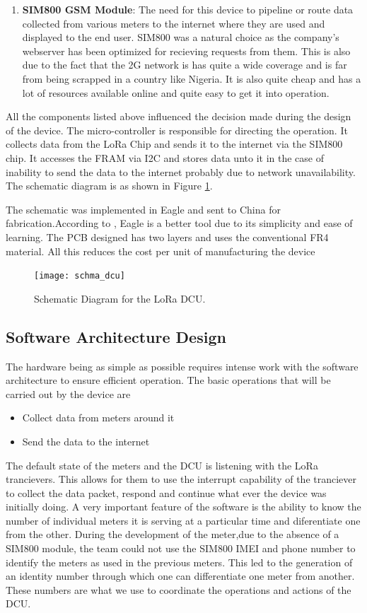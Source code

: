 \begin{enumerate}
\item \textbf{SIM800 GSM Module}: The need for this device to pipeline or route data collected from various meters to the internet where they are used and displayed to the end user. SIM800 was a natural choice as the company's webserver has been optimized for recieving requests from them. This is also due to the fact that the 2G network is has quite a wide coverage and is far from being scrapped in a country like Nigeria. It is also quite cheap and has a lot of resources available online and quite easy to get it into operation. 
\end{enumerate}

All the components listed above influenced the decision made during the design of the device. The micro-controller is responsible for directing the operation. It collects data from the LoRa Chip and sends it to the internet via the SIM800 chip. It accesses the FRAM via I2C and stores data unto it in the case of inability to send the data to the internet probably due to network unavailability. 
The schematic diagram is as shown in Figure \ref{fig:DCU_SCHEMA_iot}. 

The schematic was implemented in Eagle and sent to China for fabrication.According to \citet{eagle}, Eagle is a better tool due to its simplicity and ease of learning. The PCB designed has two layers and uses the conventional FR4 material. All this reduces the cost per unit of manufacturing the device

\begin{figure}
    \centering
    \texttt{[image: schma\_dcu]}
	\caption{Schematic Diagram for the LoRa DCU.}
    \label{fig:DCU_SCHEMA_iot}
\end{figure}


\subsection{Software Architecture Design}
The hardware being as simple as possible requires intense work with the software architecture to ensure efficient operation. The basic operations that will be carried out by the device are
\begin{itemize}
\item Collect data from meters around it
\item Send the data to the internet
\end{itemize} 
The default state of the meters and the DCU is listening with the LoRa trancievers. This allows for them to use the interrupt capability of the tranciever to collect the data packet, respond and continue what ever the device was initially doing.
A very important feature of the software is the ability to know the number of individual meters it is serving at a particular time and  diferentiate one from the other. During the development of the meter,due to the absence of a SIM800 module, the team could not use the SIM800 IMEI and phone number to identify the meters as used in the previous meters. This led to the generation of an identity number through which one can differentiate one meter from another. These numbers are what we use to coordinate the operations and actions of the DCU.

